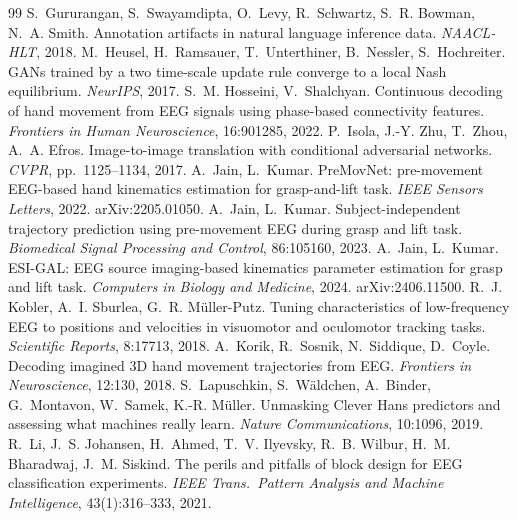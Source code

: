 \documentclass[11pt]{article}
\begin{document}
\begin{thebibliography}{99}
 S.~Gururangan, S.~Swayamdipta, O.~Levy, R.~Schwartz, S.~R. Bowman, N.~A. Smith. Annotation artifacts in natural language inference data. \emph{NAACL-HLT}, 2018.
 M.~Heusel, H.~Ramsauer, T.~Unterthiner, B.~Nessler, S.~Hochreiter. GANs trained by a two time-scale update rule converge to a local Nash equilibrium. \emph{NeurIPS}, 2017.
 S.~M. Hosseini, V.~Shalchyan. Continuous decoding of hand movement from EEG signals using phase-based connectivity features. \emph{Frontiers in Human Neuroscience}, 16:901285, 2022.
 P.~Isola, J.-Y. Zhu, T.~Zhou, A.~A. Efros. Image-to-image translation with conditional adversarial networks. \emph{CVPR}, pp.~1125--1134, 2017.
 A.~Jain, L.~Kumar. PreMovNet: pre-movement EEG-based hand kinematics estimation for grasp-and-lift task. \emph{IEEE Sensors Letters}, 2022. arXiv:2205.01050.
 A.~Jain, L.~Kumar. Subject-independent trajectory prediction using pre-movement EEG during grasp and lift task. \emph{Biomedical Signal Processing and Control}, 86:105160, 2023.
 A.~Jain, L.~Kumar. ESI-GAL: EEG source imaging-based kinematics parameter estimation for grasp and lift task. \emph{Computers in Biology and Medicine}, 2024. arXiv:2406.11500.
 R.~J. Kobler, A.~I. Sburlea, G.~R. M\"uller-Putz. Tuning characteristics of low-frequency EEG to positions and velocities in visuomotor and oculomotor tracking tasks. \emph{Scientific Reports}, 8:17713, 2018.
 A.~Korik, R.~Sosnik, N.~Siddique, D.~Coyle. Decoding imagined 3D hand movement trajectories from EEG. \emph{Frontiers in Neuroscience}, 12:130, 2018.
 S.~Lapuschkin, S.~W\"aldchen, A.~Binder, G.~Montavon, W.~Samek, K.-R. M\"uller. Unmasking Clever Hans predictors and assessing what machines really learn. \emph{Nature Communications}, 10:1096, 2019.
 R.~Li, J.~S. Johansen, H.~Ahmed, T.~V. Ilyevsky, R.~B. Wilbur, H.~M. Bharadwaj, J.~M. Siskind. The perils and pitfalls of block design for EEG classification experiments. \emph{IEEE Trans.\ Pattern Analysis and Machine Intelligence}, 43(1):316--333, 2021.


\end{thebibliography}
\end{document}
